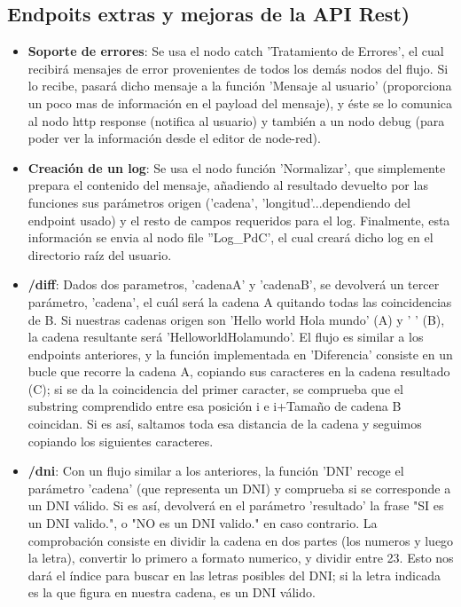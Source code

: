 \documentclass{article}
\begin{document}
\newpage
\subsection{Endpoits extras y mejoras de la API Rest)}
\begin{itemize}
\item \textbf{Soporte de errores}: Se usa el nodo catch 'Tratamiento de Errores', el cual recibirá mensajes de error provenientes de todos los demás nodos del flujo. Si lo recibe, pasará dicho mensaje a la función 'Mensaje al usuario' (proporciona un poco mas de información en el payload del mensaje), y éste se lo comunica al nodo http response (notifica al usuario) y también a un nodo debug (para poder ver la información desde el editor de node-red).

\item \textbf{Creación de un log}: Se usa el nodo función 'Normalizar', que simplemente prepara el contenido del mensaje, añadiendo al resultado devuelto por las funciones sus parámetros origen ('cadena', 'longitud'...dependiendo del endpoint usado) y el resto de campos requeridos para el log. Finalmente, esta información se envia al nodo file ''Log\_PdC', el cual creará dicho log en el directorio raíz del usuario.

\item \textbf{/diff}: Dados dos parametros, 'cadenaA' y 'cadenaB', se devolverá un tercer parámetro, 'cadena', el cuál será la cadena A quitando todas las coincidencias de B. Si nuestras cadenas origen son 'Hello world Hola mundo' (A) y ' ' (B), la cadena resultante será 'HelloworldHolamundo'. El flujo es similar a los endpoints anteriores, y la función implementada en 'Diferencia' consiste en un bucle que recorre la cadena A, copiando sus caracteres en la cadena resultado (C); si se da la coincidencia del primer caracter, se comprueba que el substring comprendido entre esa posición i e i+Tamaño de cadena B coincidan. Si es así, saltamos toda esa distancia de la cadena y seguimos copiando los siguientes caracteres.

\item \textbf{/dni}: Con un flujo similar a los anteriores, la función 'DNI' recoge el parámetro 'cadena' (que representa un DNI) y comprueba si se corresponde a un DNI válido. Si es así, devolverá en el parámetro 'resultado' la frase "SI es un DNI valido.", o "NO es un DNI valido." en caso contrario. La comprobación consiste en dividir la cadena en dos partes (los numeros y luego la letra), convertir lo primero  a formato numerico, y dividir entre 23. Esto nos dará el índice para buscar en las letras posibles del DNI; si la letra indicada es la que figura en nuestra cadena, es un DNI válido.


\end{itemize}
\end{document}

